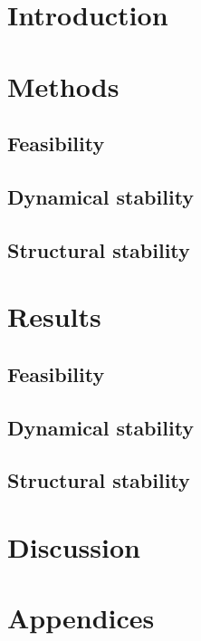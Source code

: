 \documentclass[12pt, titlepage, twoside, openright]{report}
\begin{document}
  
  \tableofcontents
  \chapter{Introduction}
  

  \chapter{Methods}\label{chap : methods}
  \section{Feasibility}\label{sec : methods feasibility}
  
  \FloatBarrier
  \newpage
  \section{Dynamical stability}\label{sec : methods dynamical stability}
  
  \FloatBarrier
  \newpage
  \section{Structural stability}
  
  \FloatBarrier

  \chapter{Results}\label{chapter : results}
  
  \section{Feasibility}
  
  \FloatBarrier
  \newpage
  \section{Dynamical stability}
  
  \FloatBarrier
  \newpage
  \section{Structural stability}\label{sec : results structural stability}
  
  \FloatBarrier
  \chapter{Discussion}
  
  \FloatBarrier
  \chapter{Appendices}
  
  \printbibliography
\end{document}
